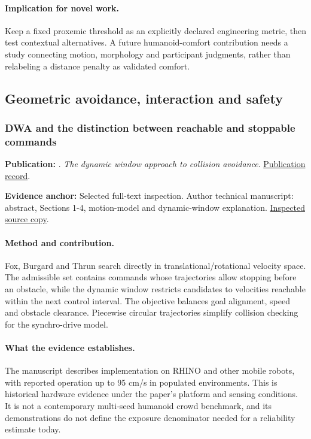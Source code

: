 \paragraph{Implication for novel work.} Keep a fixed proxemic threshold as an explicitly declared engineering metric, then test contextual alternatives. A future humanoid-comfort contribution needs a study connecting motion, morphology and participant judgments, rather than relabeling a distance penalty as validated comfort.

\subsection{Geometric avoidance, interaction and safety}
\subsubsection{DWA and the distinction between reachable and stoppable commands}\label{paper:dwa}
\textbf{Publication:} \citet{dwa}. \emph{The dynamic window approach to collision avoidance}. \href{https://doi.org/10.1109/100.580977}{Publication record}.

\textbf{Evidence anchor:} Selected full-text inspection. Author technical manuscript: abstract, Sections 1-4, motion-model and dynamic-window explanation. \href{https://publications.ri.cmu.edu/storage/publications/pub_files/pub1/fox_dieter_1997_1/fox_dieter_1997_1.pdf}{Inspected source copy}.

\paragraph{Method and contribution.} Fox, Burgard and Thrun search directly in translational/rotational velocity space. The admissible set contains commands whose trajectories allow stopping before an obstacle, while the dynamic window restricts candidates to velocities reachable within the next control interval. The objective balances goal alignment, speed and obstacle clearance. Piecewise circular trajectories simplify collision checking for the synchro-drive model.

\paragraph{What the evidence establishes.} The manuscript describes implementation on RHINO and other mobile robots, with reported operation up to 95 cm/s in populated environments. This is historical hardware evidence under the paper's platform and sensing conditions. It is not a contemporary multi-seed humanoid crowd benchmark, and its demonstrations do not define the exposure denominator needed for a reliability estimate today.

